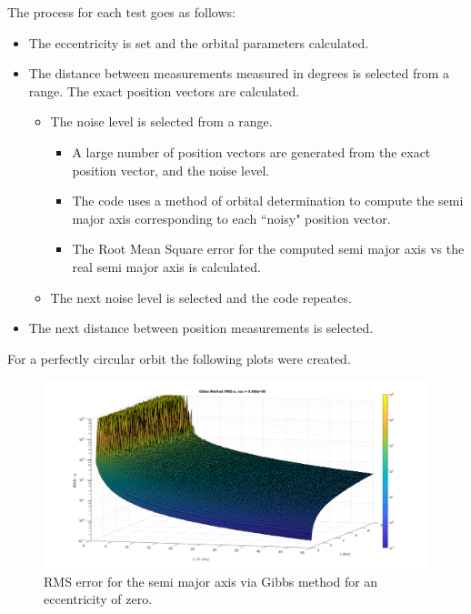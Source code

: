 \documentclass[12pt]{article}
\begin{document}
	The process for each test goes as follows:
	\begin{itemize}
		\item The eccentricity is set and the orbital parameters calculated.
		\item The distance between measurements measured in degrees is selected from a range. The exact position vectors are calculated.
		\begin{itemize}
			\item The noise level is selected from a range. 
			\begin{itemize}
				\item A large number of position vectors are generated from the exact position vector, and the noise level.
				\item The code uses a method of orbital determination to compute the semi major axis corresponding to each ``noisy" position vector. 
				\item The Root Mean Square error for the computed semi major axis vs the real semi major axis is calculated. 

			\end{itemize}
				\item The next noise level is selected and the code repeates.
		\end{itemize}
		\item The next distance between position measurements is selected.
	\end{itemize}

	For a perfectly circular orbit the following plots were created.
	\begin{figure}
		\centering
		\includegraphics[width=0.7\linewidth]{circularGibbs}
		\caption{RMS error for the semi major axis via Gibbs method for an eccentricity of zero.}
		\label{fig:circulargibbs}
	\end{figure}
\end{document}
